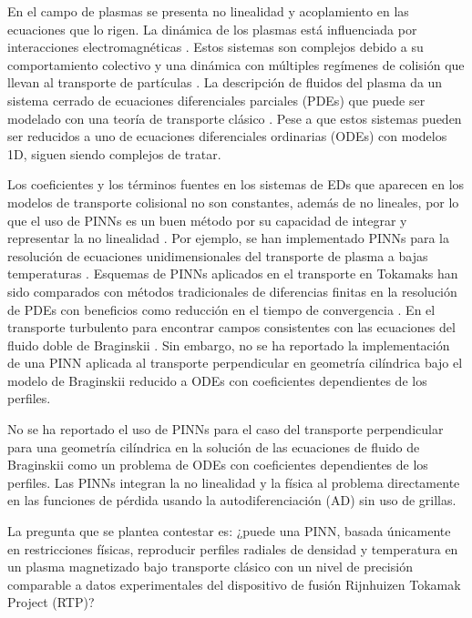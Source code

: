 En el campo de plasmas se presenta no linealidad y acoplamiento en las ecuaciones que lo rigen. La dinámica de los plasmas está influenciada por interacciones electromagnéticas \cite{helander2005}. Estos sistemas son complejos debido a su comportamiento colectivo y una dinámica con múltiples regímenes de colisión que llevan al transporte de partículas \cite{goldston1995}. La descripción de fluidos del plasma da un sistema cerrado de ecuaciones diferenciales parciales (PDEs) que puede ser modelado con  una teoría de transporte clásico \cite{freidberg2014}. Pese a que estos sistemas pueden ser reducidos a uno de ecuaciones diferenciales ordinarias (ODEs) con modelos 1D, siguen siendo complejos de tratar\cite{lechte2002, alves2018}.

Los coeficientes y los términos fuentes en los sistemas de EDs que aparecen en los modelos de transporte colisional no son constantes, además de no lineales, por lo que el uso de PINNs es un buen método por su capacidad de integrar y representar la no linealidad \cite{zhong2022}. Por ejemplo, se han implementado PINNs para la resolución de ecuaciones unidimensionales del transporte de plasma a bajas temperaturas \cite{zhong2022, trieschmann2023}. Esquemas de PINNs aplicados en el transporte en Tokamaks han sido comparados con métodos tradicionales de diferencias finitas en la resolución de PDEs con beneficios como reducción en el tiempo de convergencia \cite{seo2024}. En el transporte turbulento para encontrar campos consistentes con las ecuaciones del fluido doble de Braginskii \cite{mathews2021}. Sin embargo, no se ha reportado la implementación de una PINN aplicada al transporte perpendicular en geometría cilíndrica bajo el modelo de Braginskii reducido a ODEs con coeficientes dependientes de los perfiles.

No se ha reportado el uso de PINNs para el caso del transporte perpendicular para una geometría cilíndrica en la solución de las ecuaciones de fluido de Braginskii como un problema de ODEs con coeficientes dependientes de los perfiles. Las PINNs integran la no linealidad y la física al problema directamente en las funciones de pérdida usando la autodiferenciación (AD) sin uso de grillas. 

La pregunta que se plantea contestar es: ¿puede una PINN, basada únicamente en restricciones físicas, reproducir perfiles radiales de densidad y temperatura en un plasma magnetizado bajo transporte clásico con un nivel de precisión comparable a datos experimentales del dispositivo de fusión Rijnhuizen Tokamak Project (RTP)?

